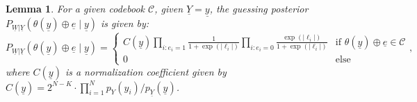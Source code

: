 \documentclass[letterpaper,draftclsnofoot,onecolumn]{IEEEtran}
\newtheorem{lemma}{Lemma}
\begin{document}
\begin{lemma}\label{lemma:posterior_probability_codebook}
    For a given codebook $\mathcal{C}$, given $\underline{Y} = \underline{y}$, the guessing posterior $P_{\underline{{W}}|\underline{Y}}(\theta(\underline{y})\oplus \underline{e} \mid \underline{y})$ is given by:
    \begin{equation}\label{eq:posterior_2}
        P_{\underline{W}|\underline{Y}}\left(\theta(\underline{y})\oplus \underline{e} \mid \underline{y}\right) = \left\{\begin{array}{ll}
        C(\underline{y})\prod_{i:e_i = 1}\frac{1}{1+\exp(|\ell_i|)}\prod_{i:e_i = 0}\frac{\exp(|\ell_i|)}{1+\exp(|\ell_i|)}      & \text{if } \theta(\underline{y})\oplus \underline{e} \in \mathcal{C} \\
        0     & \text{else}
        \end{array} \right. ,
\end{equation}
where $C(\underline{y})$ is a normalization coefficient given by $C(\underline{y}) = 2^{N - K} \cdot  \prod_{i = 1}^N p_Y(y_i)/p_{\underline{Y}}(\underline{y})$. %
\end{lemma}
\end{document}
